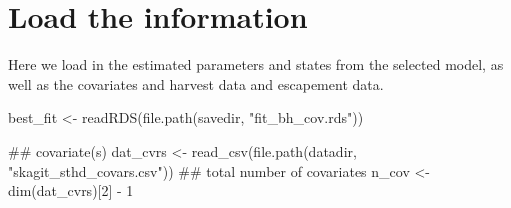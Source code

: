 \documentclass[11pt,]{article}
\newenvironment{Shaded}{}{}
\newcommand{\CharTok}[1]{\textcolor[rgb]{0.00,0.50,0.50}{#1}}
\newcommand{\CommentTok}[1]{\textcolor[rgb]{0.00,0.50,0.00}{#1}}
\newcommand{\ControlFlowTok}[1]{\textcolor[rgb]{0.00,0.00,1.00}{#1}}
\newcommand{\DataTypeTok}[1]{#1}
\newcommand{\DecValTok}[1]{#1}
\newcommand{\KeywordTok}[1]{\textcolor[rgb]{0.00,0.00,1.00}{#1}}
\newcommand{\NormalTok}[1]{#1}
\newcommand{\OperatorTok}[1]{#1}
\newcommand{\StringTok}[1]{\textcolor[rgb]{0.00,0.50,0.50}{#1}}
\begin{document}
\begin{Shaded}
\end{Shaded}

\hypertarget{load-the-information}{%
\section{Load the information}\label{load-the-information}}

Here we load in the estimated parameters and states from the selected
model, as well as the covariates and harvest data and escapement data.

\begin{Shaded}
\begin{Highlighting}[]
\NormalTok{best_fit <-}\StringTok{ }\KeywordTok{readRDS}\NormalTok{(}\KeywordTok{file.path}\NormalTok{(savedir, }\StringTok{"fit_bh_cov.rds"}\NormalTok{))}
\end{Highlighting}
\end{Shaded}

\begin{Shaded}
\begin{Highlighting}[]
\CommentTok{## covariate(s)}
\NormalTok{dat_cvrs <-}\StringTok{ }\KeywordTok{read_csv}\NormalTok{(}\KeywordTok{file.path}\NormalTok{(datadir, }\StringTok{"skagit_sthd_covars.csv"}\NormalTok{))}
\CommentTok{## total number of covariates}
\NormalTok{n_cov <-}\StringTok{ }\KeywordTok{dim}\NormalTok{(dat_cvrs)[}\DecValTok{2}\NormalTok{] }\OperatorTok{-}\StringTok{ }\DecValTok{1}
\end{Highlighting}
\end{Shaded}
\end{document}
